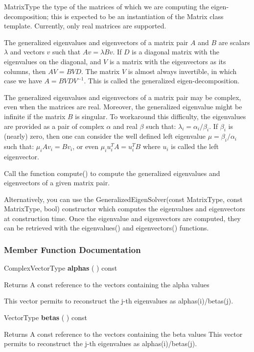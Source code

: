 MatrixType the type of the matrices of which we are computing the eigen-decomposition; this is expected to be an instantiation of the Matrix class template. Currently, only real matrices are supported. 

The generalized eigenvalues and eigenvectors of a matrix pair $A$ and $B$ are scalars $\lambda$ and vectors $v$ such that $A v = \lambda B v$. If $D$ is a diagonal matrix with the eigenvalues on the diagonal, and $V$ is a matrix with the eigenvectors as its columns, then $A V = B V D$. The matrix $V$ is almost always invertible, in which case we have $A = B V D V^{-1}$. This is called the generalized eigen-decomposition.

The generalized eigenvalues and eigenvectors of a matrix pair may be complex, even when the matrices are real. Moreover, the generalized eigenvalue might be infinite if the matrix $B$ is singular. To workaround this difficulty, the eigenvalues are provided as a pair of complex $\alpha$ and real $\beta$ such that: $\lambda_i = \alpha_i / \beta_i$. If $\beta_i$ is (nearly) zero, then one can consider the well defined left eigenvalue $\mu = \beta_i / \alpha_i$  such that: $\mu_i A v_i = B v_i$, or even $\mu_i u_i^TA = u_i^T B$  where $u_i$  is called the left eigenvector.

Call the function compute() to compute the generalized eigenvalues and eigenvectors of a given matrix pair. 

Alternatively, you can use the GeneralizedEigenSolver(const MatrixType, const MatrixType, bool) constructor which computes the eigenvalues and eigenvectors at construction time. Once the eigenvalue and eigenvectors are computed, they can be retrieved with the eigenvalues() and eigenvectors() functions.

\subsubsection{Member Function Documentation}

ComplexVectorType \textbf{alphas}  ( )  const 

Returns A const reference to the vectors containing the alpha values

This vector permits to reconstruct the j-th eigenvalues as alphas(i)/betas(j).


\vspace{0.3cm}
VectorType \textbf{betas}  ( )  const 

Returns A const reference to the vectors containing the beta values
This vector permits to reconstruct the j-th eigenvalues as alphas(i)/betas(j).


